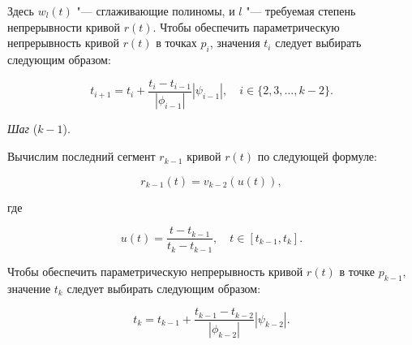 Здесь $w_l(t)$ "--- сглаживающие полиномы, и $l$ "--- требуемая степень непрерывности кривой $r(t)$. Чтобы обеспечить
параметрическую непрерывность кривой $r(t)$ в точках $p_i$, значения $t_i$ следует выбирать следующим образом:

$$
t_{i+1}=t_i+\frac{t_i-t_{i-1}}{|\phi_{i-1}|}|\psi_{i-1}|, \quad i \in \{2,3,\dots,k-2\}.
$$

\bigskip
\textit{Шаг} ($k-1$).

Вычислим последний сегмент $r_{k-1}$ кривой $r(t)$ по следующей формуле:

$$
r_{k-1}(t)=v_{k-2}(u(t)),
$$

\noindent где

$$
u(t)=\frac{t-t_{k-1}}{t_k-t_{k-1}}, \quad t \in [t_{k-1},t_k].
$$

Чтобы обеспечить параметрическую непрерывность кривой $r(t)$ в точке $p_{k-1}$, значение $t_k$ следует выбирать
следующим образом:

$$
t_k=t_{k-1}+\frac{t_{k-1}-t_{k-2}}{|\phi_{k-2}|}|\psi_{k-2}|.
$$
